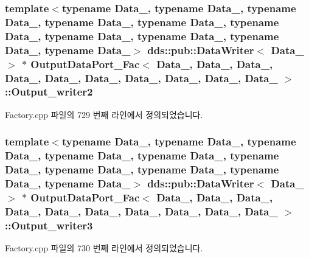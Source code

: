 \subsubsection[{\texorpdfstring{Output\+\_\+writer2}{Output_writer2}}]{\setlength{\rightskip}{0pt plus 5cm}template$<$typename Data\+\_, typename Data\+\_, typename Data\+\_, typename Data\+\_, typename Data\+\_, typename Data\+\_, typename Data\+\_, typename Data\+\_, typename Data\+\_, typename Data\+\_$>$ dds\+::pub\+::\+Data\+Writer$<$ Data\+\_ $>$ $\ast$ {\bf Output\+Data\+Port\+\_\+\+Fac}$<$ Data\+\_, Data\+\_, Data\+\_, Data\+\_, Data\+\_, Data\+\_, Data\+\_, Data\+\_, Data\+\_, Data\+\_ $>$\+::Output\+\_\+writer2}\hypertarget{classOutputDataPort__Fac_a0839f4e13e85a690e7f9b3ecdccc0319}{}\label{classOutputDataPort__Fac_a0839f4e13e85a690e7f9b3ecdccc0319}


Factory.\+cpp 파일의 729 번째 라인에서 정의되었습니다.

\subsubsection[{\texorpdfstring{Output\+\_\+writer3}{Output_writer3}}]{\setlength{\rightskip}{0pt plus 5cm}template$<$typename Data\+\_, typename Data\+\_, typename Data\+\_, typename Data\+\_, typename Data\+\_, typename Data\+\_, typename Data\+\_, typename Data\+\_, typename Data\+\_, typename Data\+\_$>$ dds\+::pub\+::\+Data\+Writer$<$ Data\+\_ $>$ $\ast$ {\bf Output\+Data\+Port\+\_\+\+Fac}$<$ Data\+\_, Data\+\_, Data\+\_, Data\+\_, Data\+\_, Data\+\_, Data\+\_, Data\+\_, Data\+\_, Data\+\_ $>$\+::Output\+\_\+writer3}\hypertarget{classOutputDataPort__Fac_a4223e7e2d3f2eda4ccf80e3515b6067a}{}\label{classOutputDataPort__Fac_a4223e7e2d3f2eda4ccf80e3515b6067a}


Factory.\+cpp 파일의 730 번째 라인에서 정의되었습니다.

